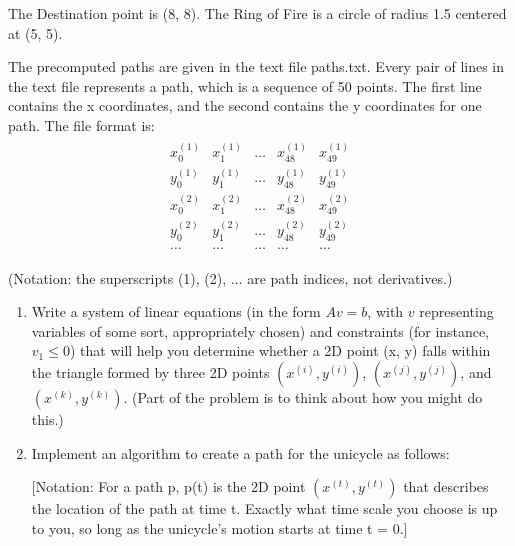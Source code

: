 \documentclass[conference,onecolumn]{IEEEtran}
\begin{document}
\begin{enumerate}[label=\arabic{enumi}.]
          The Destination point is (8, 8). The Ring of Fire is a circle of radius 1.5 centered at (5, 5).

          The precomputed paths are given in the text file paths.txt.
          Every pair of lines in the text file represents a path, which is a sequence of 50 points.
          The first line contains the x coordinates, and the second contains the y coordinates for one path.
          The file format is:
          \begin{align*}
              \begin{matrix}
                  x_0^{(1)} & x_1^{(1)} & \ldots & x_{48}^{(1)} & x_{49}^{(1)} \\
                  y_0^{(1)} & y_1^{(1)} & \ldots & y_{48}^{(1)} & y_{49}^{(1)} \\
                  x_0^{(2)} & x_1^{(2)} & \ldots & x_{48}^{(2)} & x_{49}^{(2)} \\
                  y_0^{(2)} & y_1^{(2)} & \ldots & y_{48}^{(2)} & y_{49}^{(2)} \\
                  \ldots    & \ldots    & \ldots & \ldots       & \ldots
              \end{matrix}
          \end{align*}
          \begin{center}
              (Notation: the superscripts (1), (2), $\ldots$ are path indices, not derivatives.)
          \end{center}

          \begin{enumerate}
              \item Write a system of linear equations (in the form $Av = b$, with $v$ representing variables of some sort, appropriately chosen) and constraints (for instance, $v_1 \leq 0$) that will help you determine whether a 2D point (x, y) falls within the triangle formed by three 2D points $(x^{(i)}, y^{(i)})$, $(x^{(j)}, y^{(j)})$, and $(x^{(k)}, y^{(k)})$.
                    (Part of the problem is to think about how you might do this.)
              \item Implement an algorithm to create a path for the unicycle as follows:

                    [Notation: For a path p, p(t) is the 2D point $(x^{(t)}, y^{(t)})$ that describes the location of the path at time t.
                    Exactly what time scale you choose is up to you, so long as the unicycle's motion starts at time t = 0.]


\end{enumerate}
\end{enumerate}
\end{document}
